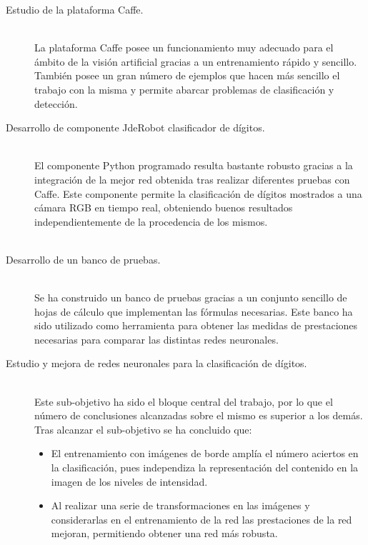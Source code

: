 \begin{description}
	\item[Estudio de la plataforma Caffe.] \hfill 
	\vspace{5pt}
	\\
	La plataforma Caffe posee un funcionamiento muy adecuado para el ámbito de la visión artificial gracias a un entrenamiento rápido y sencillo. También posee un gran número de ejemplos que hacen más sencillo el trabajo con la misma y permite abarcar problemas de clasificación y detección.
	\item[Desarrollo de componente JdeRobot clasificador de dígitos.] \hfill 
	\vspace{5pt}
	\\
	El componente Python programado resulta bastante robusto gracias a la integración de la mejor red obtenida tras realizar diferentes pruebas con Caffe. Este componente permite la clasificación de dígitos mostrados a una cámara RGB en tiempo real, obteniendo buenos resultados independientemente de la procedencia de los mismos.\\
	\vspace{20pt}
	\\
	\item[Desarrollo de un banco de pruebas.] \hfill 
	\vspace{5pt}
	\\
	Se ha construido un banco de pruebas gracias a un conjunto sencillo de hojas de cálculo que implementan las fórmulas necesarias. Este banco ha sido utilizado como herramienta para obtener las medidas de prestaciones necesarias para comparar las distintas redes neuronales.
	\item[Estudio y mejora de redes neuronales para la clasificación de dígitos.] \hfill 
	\vspace{5pt}
	\\
	Este sub-objetivo ha sido el bloque central del trabajo, por lo que el número de conclusiones alcanzadas sobre el mismo es superior a los demás. Tras alcanzar el sub-objetivo se ha concluido que:
	\begin{itemize}
		\item El entrenamiento con imágenes de borde amplía el número aciertos en la clasificación, pues independiza la representación del contenido en la imagen de los niveles de intensidad.
		\item Al realizar una serie de  transformaciones en las imágenes y considerarlas en el entrenamiento de la red las prestaciones de la red mejoran, permitiendo obtener una red más robusta.

\end{itemize}
\end{description}
